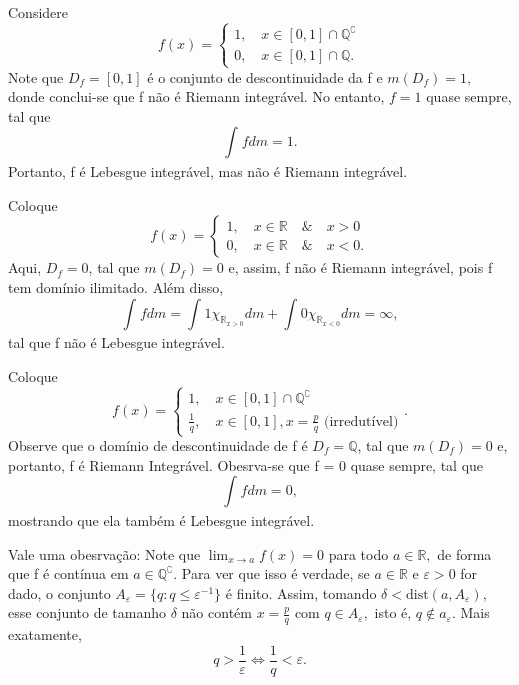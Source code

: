 \documentclass[measure_theory.tex]{subfiles}
\begin{document}
\begin{example}
	Considere
	\[
		f(x) = \left\{\begin{array}{ll}
			1,\quad x\in [0,1]\cap \mathbb{Q}^{\complement} \\
			0,\quad x\in [0,1]\cap \mathbb{Q}.
		\end{array}\right.
	\]
	Note que \(D_{f} = [0, 1]\) é o conjunto de descontinuidade da f e \(m(D_{f}) = 1,\) donde conclui-se que f não é Riemann integrável. No entanto,
	\(f=1\) quase sempre, tal que
	\[
		\int_{}f dm = 1.
	\]
	Portanto, f é Lebesgue integrável, mas não é Riemann integrável.
\end{example}
\begin{example}
	Coloque
	\[
		f(x) = \left\{\begin{array}{ll}
			1,\quad x\in \mathbb{R} \quad \&\quad x>0 \\
			0,\quad x\in \mathbb{R} \quad \&\quad  x < 0.
		\end{array}\right.
	\]
	Aqui, \(D_{f} = 0\), tal que \(m(D_{f}) = 0\) e, assim, f não é Riemann integrável, pois f tem domínio ilimitado. Além disso,
	\[
		\int_{}f dm = \int_{}1 \chi_{\mathbb{R}_{x > 0}} dm + \int_{}0\chi_{\mathbb{R}_{x < 0}} dm = \infty,
	\]
	tal que f não é Lebesgue integrável.
\end{example}
\begin{example}
	Coloque
	\[
		f(x) = \left\{\begin{array}{ll}
			1,\quad x\in [0, 1]\cap \mathbb{Q}^{\complement} \\
			\frac{1}{q},\quad x\in[0,1], x = \frac{p}{q}\text{ (irredutível)}
		\end{array}\right..
	\]
	Observe que o domínio de descontinuidade de f é \(D_f = \mathbb{Q}\), tal que \(m(D_{f}) = 0\) e, portanto, f é Riemann Integrável. Obesrva-se que f = 0 quase sempre, tal que
	\[
		\int_{}f dm = 0,
	\]
	mostrando que ela também é Lebesgue integrável.

	Vale uma obesrvação: Note que \(\lim_{x\to a}f(x) = 0\) para todo \(a\in \mathbb{R},\) de forma que f é contínua em \(a\in \mathbb{Q}^{\complement}\). Para ver que isso é verdade, se \(a\in \mathbb{R}\) e \(\varepsilon > 0\) for dado,
	o conjunto \(A_{\varepsilon } = \{q: q \leq \varepsilon^{-1}\}\) é finito. Assim, tomando \(\delta  < \mathrm{dist}(a, A_{\varepsilon }),\) esse conjunto de tamanho \(\delta \) não contém \(x = \frac{p}{q}\) com \(q\in A_{\varepsilon },\) isto é,
	\(q\not\in a_{\varepsilon }.\) Mais exatamente,
	\[
		q > \frac{1}{\varepsilon } \Longleftrightarrow \frac{1}{q} < \varepsilon .
	\]
\end{example}
\end{document}
